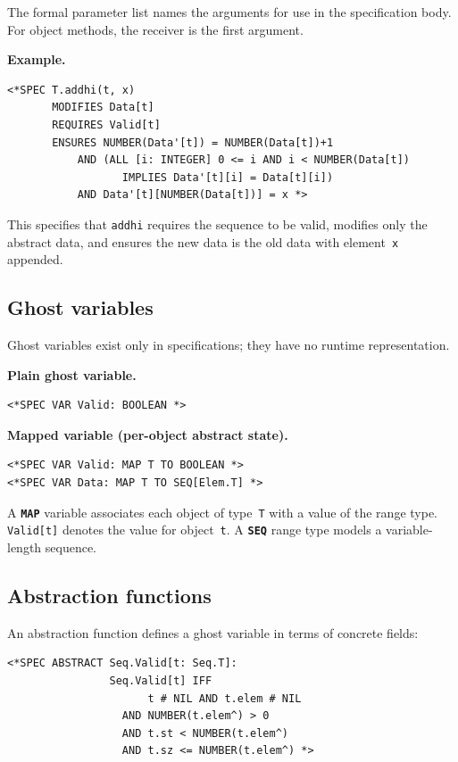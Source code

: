\documentclass[11pt]{article}
\newcommand{\m}[1]{\texttt{#1}}
\newcommand{\kw}[1]{\texttt{\textbf{#1}}}
\begin{document}
The formal parameter list names the arguments for use in the
specification body.  For object methods, the receiver is the first
argument.

\medskip\noindent\textbf{Example.}

\begin{lstlisting}[language=ESC]
<*SPEC T.addhi(t, x)
       MODIFIES Data[t]
       REQUIRES Valid[t]
       ENSURES NUMBER(Data'[t]) = NUMBER(Data[t])+1
           AND (ALL [i: INTEGER] 0 <= i AND i < NUMBER(Data[t])
                  IMPLIES Data'[t][i] = Data[t][i])
           AND Data'[t][NUMBER(Data[t])] = x *>
\end{lstlisting}

This specifies that \m{addhi} requires the sequence to be valid,
modifies only the abstract data, and ensures the new data is the old
data with element~\m{x} appended.

\subsection{Ghost variables}
\label{sec:ghost}

Ghost variables exist only in specifications; they have no runtime
representation.

\medskip\noindent\textbf{Plain ghost variable.}

\begin{lstlisting}[language=ESC]
<*SPEC VAR Valid: BOOLEAN *>
\end{lstlisting}

\medskip\noindent\textbf{Mapped variable (per-object abstract state).}

\begin{lstlisting}[language=ESC]
<*SPEC VAR Valid: MAP T TO BOOLEAN *>
<*SPEC VAR Data: MAP T TO SEQ[Elem.T] *>
\end{lstlisting}

A \kw{MAP} variable associates each object of type~\m{T} with a value
of the range type.  \m{Valid[t]} denotes the value for object~\m{t}.
A \kw{SEQ} range type models a variable-length sequence.

\subsection{Abstraction functions}

An abstraction function defines a ghost variable in terms of concrete
fields:

\begin{lstlisting}[language=ESC]
<*SPEC ABSTRACT Seq.Valid[t: Seq.T]:
                Seq.Valid[t] IFF
                      t # NIL AND t.elem # NIL
                  AND NUMBER(t.elem^) > 0
                  AND t.st < NUMBER(t.elem^)
                  AND t.sz <= NUMBER(t.elem^) *>
\end{lstlisting}
\end{document}
